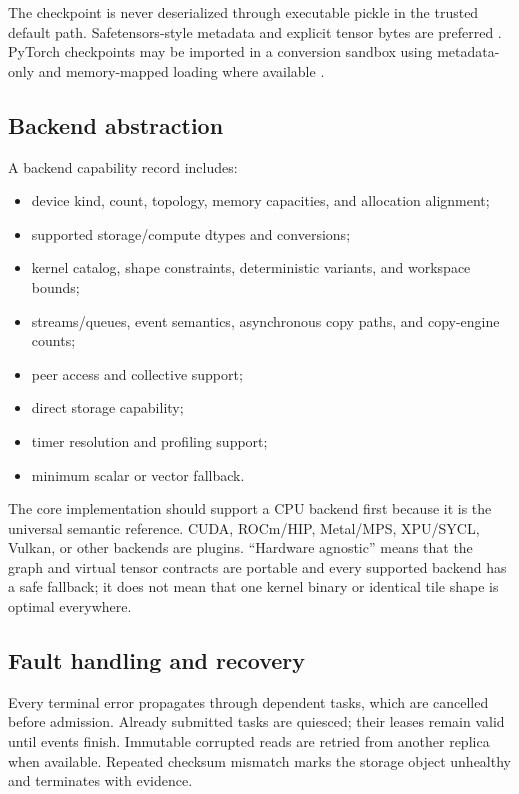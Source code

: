 The checkpoint is never deserialized through executable pickle in the trusted default path. Safetensors-style metadata and explicit tensor bytes are preferred \cite{safetensors}. PyTorch checkpoints may be imported in a conversion sandbox using metadata-only and memory-mapped loading where available \cite{pytorch_serialization}.

\subsection{Backend abstraction}

A backend capability record includes:

\begin{itemize}
  \item device kind, count, topology, memory capacities, and allocation alignment;
  \item supported storage/compute dtypes and conversions;
  \item kernel catalog, shape constraints, deterministic variants, and workspace bounds;
  \item streams/queues, event semantics, asynchronous copy paths, and copy-engine counts;
  \item peer access and collective support;
  \item direct storage capability;
  \item timer resolution and profiling support;
  \item minimum scalar or vector fallback.
\end{itemize}

The core implementation should support a CPU backend first because it is the universal semantic reference. CUDA, ROCm/HIP, Metal/MPS, XPU/SYCL, Vulkan, or other backends are plugins. ``Hardware agnostic'' means that the graph and virtual tensor contracts are portable and every supported backend has a safe fallback; it does not mean that one kernel binary or identical tile shape is optimal everywhere.

\subsection{Fault handling and recovery}

Every terminal error propagates through dependent tasks, which are cancelled before admission. Already submitted tasks are quiesced; their leases remain valid until events finish. Immutable corrupted reads are retried from another replica when available. Repeated checksum mismatch marks the storage object unhealthy and terminates with evidence.

